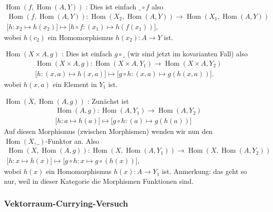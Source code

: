 \documentclass[a4paper]{amsart}
\theoremstyle{definition}
\DeclareMathOperator{\Hom}{Hom}
\begin{document}
\boldmath $\Hom(f{,} \Hom( A{,} Y) )$ \unboldmath: Dies ist einfach $\_ \circ f$ also
\begin{align}
   \Hom( f, \Hom(A , Y) ) \colon \Hom(X_2, \Hom(A , Y) ) \to \Hom(X_1, \Hom(A , Y) )\\
   \big [ h \colon x_2 \mapsto h(x_2) \big ] \mapsto \big [ h \circ f \colon (x_1) \mapsto h(f(x_1)) \big ],
\end{align}
wobei $h(c_2)$ ein Homomorphismus $h(x_2) \colon A \to Y$ ist.

\boldmath $\Hom(X \times A {,} g )$ \unboldmath: Dies ist einfach $g \circ \_$ (wir sind jetzt im kovarianten Fall) also
\begin{align}
   \Hom(X \times A {,} g ) \colon \Hom(X \times A, Y_1 ) \to \Hom(X \times A, Y_2 )\\
   \big [ h \colon (x,a) \mapsto h(x,a) \big ] \mapsto \big [ g \circ h \colon (x,a) \mapsto g(h(x,a)) \big ].
\end{align}
wobei $h(x,a)$ ein Element in $Y_1$ ist.

\boldmath $\Hom(X{,} \Hom( A{,} g) )$ \unboldmath: Zunächst ist
\begin{align}
   \Hom( A, g ) \colon \Hom( A, Y_1 ) \to \Hom( A, Y_2)\\
   \big [ h \colon a \mapsto h(a) \big ] \mapsto \big [ g \circ h \colon (a) \mapsto g(h(a)) \big ]
\end{align}
Auf diesen Morphismus (zwischen Morphismen) wenden wir nun den $\Hom(X, \_)$-Funktor an.
Also
\begin{align}
   \Hom(X, \Hom( A, g)) \colon \Hom(X, \Hom( A, Y_1)) \to \Hom(X, \Hom( A, Y_2))\\
   \big [ h \colon x \mapsto h(x) \big ] \mapsto \big [ g \circ h \colon x \mapsto g \circ (h(x)) \big ],
\end{align}
wobei $h(x)$ ein Homomorphismus $h(x) \colon A \to Y_1$ ist. Anmerkung: das geht so nur, weil in dieser Kategorie die Morphismen Funktionen sind.

\subsubsection{Vektorraum-Currying-Versuch}
\end{document}
